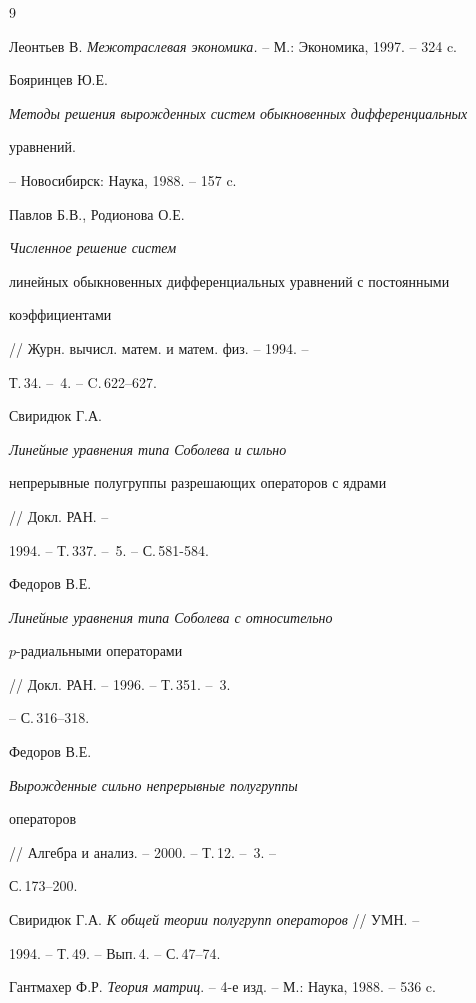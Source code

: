 \begin{thebibliography}{9}







Леонтьев В. {\it Межотраслевая экономика.} -- М.: Экономика, 1997. -- 324 c.




Бояринцев Ю.Е.


{\it Методы решения вырожденных систем обыкновенных дифференциальных


уравнений.} -- Новосибирск: Наука, 1988. -- 157 c.




Павлов Б.В., Родионова О.Е. {\it Численное решение систем


линейных обыкновенных дифференциальных уравнений с постоянными


коэффициентами} // Журн. вычисл. матем. и матем. физ. -- 1994. --


Т.\,34. -- \No\,4. -- C.\,622--627.




Свиридюк Г.А. {\it Линейные уравнения типа Соболева и сильно


непрерывные полугруппы разрешающих операторов с ядрами }// Докл. РАН. --


1994. -- Т.\,337. -- \No\,5. -- С.\,581-584.




Федоров В.Е. {\it Линейные уравнения типа Соболева с относительно


$p$-радиальными операторами} // Докл. РАН. -- 1996. -- Т.\,351. -- \No\,3.


-- С.\,316--318.




Федоров В.Е. {\it Вырожденные сильно непрерывные полугруппы


операторов} // Алгебра и анализ. -- 2000. -- Т.\,12. -- \No\,3. --


С.\,173--200.




Свиридюк Г.А. {\it К общей теории полугрупп операторов} // УМН. --


1994. -- Т.\,49. -- Вып.\,4. -- С.\,47--74.




Гантмахер Ф.Р. {\it Теория матриц}. -- 4-е изд. -- М.: Наука, 1988. -- 536 c.





\end{thebibliography}





